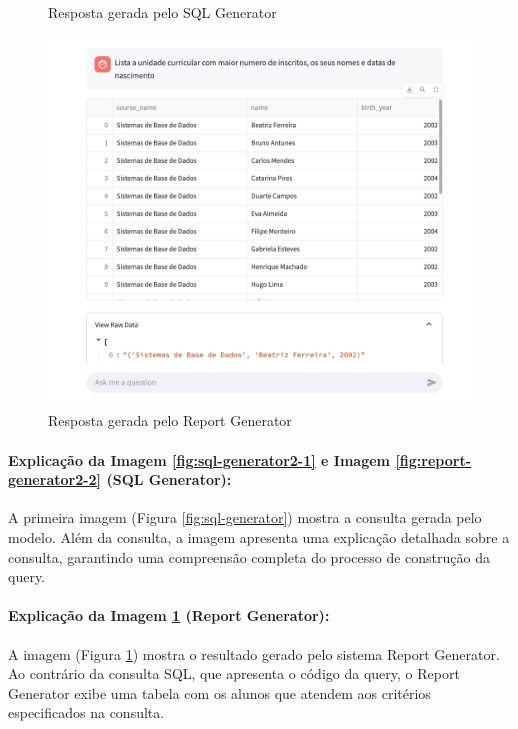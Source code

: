 \documentclass{article}
\begin{document}
\begin{figure}[ht]
\begin{minipage}{0.3\linewidth}
        \caption{Resposta gerada pelo SQL Generator}
        \label{fig:report-generator2-2}
    \end{minipage}
        \hspace{0.01\linewidth} %
    \begin{minipage}{0.3\linewidth}
        \centering
    \includegraphics[width=\linewidth]{images/report_generator2.png}
    \caption{Resposta gerada pelo Report Generator}
    \label{fig:enter-label2}
    \end{minipage}
\end{figure}


\paragraph{Explicação da Imagem \ref{fig:sql-generator2-1} e Imagem \ref{fig:report-generator2-2} (SQL Generator):}

A primeira imagem (Figura \ref{fig:sql-generator}) mostra a consulta gerada pelo modelo. Além da consulta, a imagem apresenta uma explicação detalhada sobre a consulta, garantindo uma compreensão completa do processo de construção da query.

\paragraph{Explicação da Imagem  \ref{fig:enter-label2} (Report Generator):}

A imagem (Figura \ref{fig:enter-label2}) mostra o resultado gerado pelo sistema Report Generator. Ao contrário da consulta SQL, que apresenta o código da query, o Report Generator exibe uma tabela com os alunos que atendem aos critérios especificados na consulta. 
\end{document}
